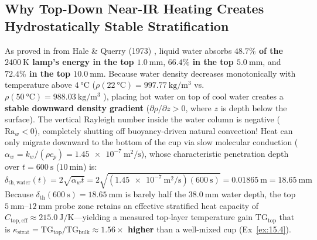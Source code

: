 \subsection{Why Top-Down Near-IR Heating Creates Hydrostatically Stable Stratification}
As proved in  from Hale \& Querry (1973) , liquid water absorbs \textbf{$48.7\%$ of the $\SI{2400}{\kelvin}$ lamp's energy in the top $\SI{1.0}{\milli\meter}$}, \textbf{$66.4\%$ in the top $\SI{5.0}{\milli\meter}$}, and \textbf{$72.4\%$ in the top $\SI{10.0}{\milli\meter}$}. Because water density decreases monotonically with temperature above $\SI{4}{\celsius}$ ($\rho(\SI{22}{\celsius}) = \SI{997.77}{\kilogram\per\cubic\meter}$ vs.\ $\rho(\SI{50}{\celsius}) = \SI{988.03}{\kilogram\per\cubic\meter}$ ), placing hot water on top of cool water creates a \textbf{stable downward density gradient} ($\partial\rho/\partial z > 0$, where $z$ is depth below the surface). The vertical Rayleigh number inside the water column is negative ($\mathrm{Ra}_w < 0$), completely shutting off buoyancy-driven natural convection! Heat can only migrate downward to the bottom of the cup via slow molecular conduction ($\alpha_w = k_w/(\rho c_p) = \SI{1.45e-7}{\square\meter\per\second}$), whose characteristic penetration depth over $t = \SI{600}{\second}$ ($\SI{10}{\minute}$) is:
\begin{equation}\label{eq:15:water-diffusion-depth}
  \delta_{\mathrm{th,water}}(t) = 2\sqrt{\alpha_w t} = 2\sqrt{(\SI{1.45e-7}{\square\meter\per\second})(\SI{600}{\second})} = \SI{0.01865}{\meter} = \SI{18.65}{\milli\meter}
\end{equation}
Because $\delta_{\mathrm{th}}(\SI{600}{\second}) = \SI{18.65}{\milli\meter}$ is barely half the $\SI{38.0}{\milli\meter}$ water depth, the top $\SIrange{5}{12}{\milli\meter}$ probe zone retains an effective stratified heat capacity of $C_{\mathrm{top,eff}} \approx \SI{215.0}{\joule\per\kelvin}$—yielding a measured top-layer temperature gain $\mathrm{TG}_{\mathrm{top}}$ that is \textbf{$\kappa_{\mathrm{strat}} = \mathrm{TG}_{\mathrm{top}}/\mathrm{TG}_{\mathrm{bulk}} \approx 1.56\times$ higher} than a well-mixed cup (Ex~\ref{ex:15.4}).

